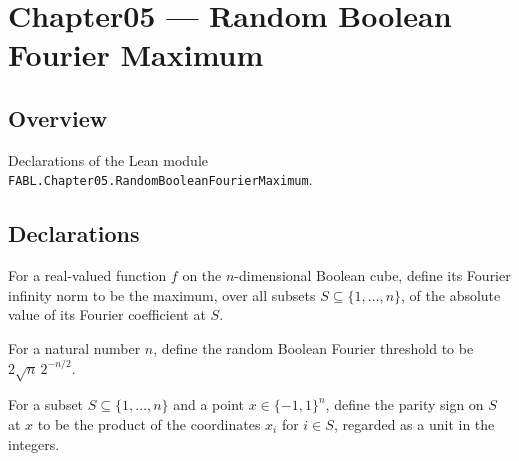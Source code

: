 \chapter{Chapter05 — Random Boolean Fourier Maximum}
\section{Overview}

Declarations of the Lean module \texttt{FABL.Chapter05.RandomBooleanFourierMaximum}.

\section{Declarations}

\begin{definition}
\label{FABL.fourierInfinityNorm}
\leanok
{}
For a real-valued function $f$ on the $n$-dimensional Boolean cube, define its Fourier
infinity norm to be the maximum, over all subsets $S\subseteq\{1,\ldots,n\}$, of the
absolute value of its Fourier coefficient at $S$.
\end{definition}

\begin{definition}
\label{FABL.randomBooleanFourierThreshold}
\leanok
For a natural number $n$, define the random Boolean Fourier threshold to be $2\sqrt
n\,2^{-n/2}$.
\end{definition}

\begin{definition}
\label{FABL.paritySign}
\leanok
{}
For a subset $S\subseteq\{1,\ldots,n\}$ and a point $x\in\{-1,1\}^n$, define the parity
sign on $S$ at $x$ to be the product of the coordinates $x_i$ for $i\in S$, regarded as
a unit in the integers.
\end{definition}

